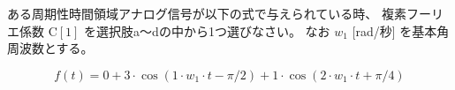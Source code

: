 ある周期性時間領域アナログ信号が以下の式で与えられている時、
複素フーリエ係数 $\textrm{C}[1]$ を選択肢a〜dの中から1つ選びなさい。
なお $w_1$ [rad/秒] を基本角周波数とする。

\[
f(t) = 
0
+ 3 \cdot \cos( 1 \cdot w_1 \cdot t - \pi/2)
+ 1 \cdot \cos( 2 \cdot w_1 \cdot t + \pi/4)
\]

